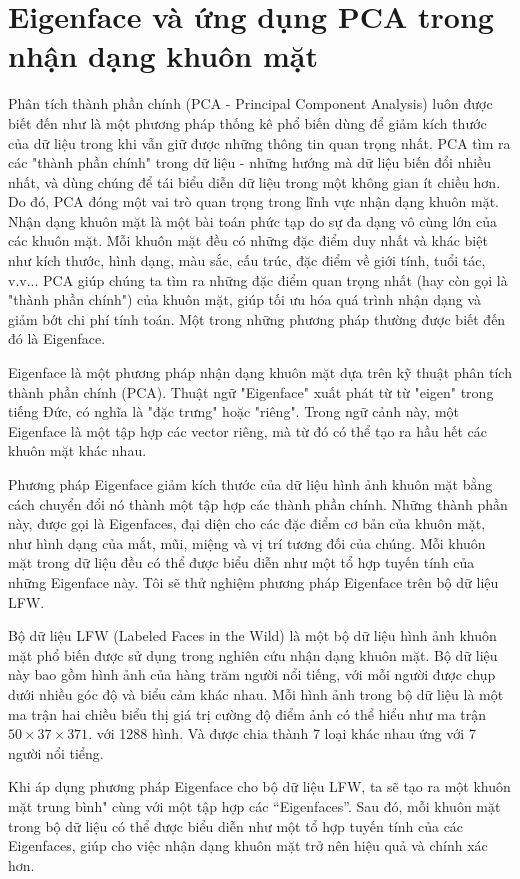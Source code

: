 \documentclass[14pt,oneside,a4paper]{report}
\numberwithin{equation}{section}
\begin{document}
\section{Eigenface và ứng dụng PCA trong nhận dạng khuôn mặt}
Phân tích thành phần chính (PCA - Principal Component Analysis) luôn được biết đến như là một phương pháp thống kê phổ biến dùng để giảm kích thước của dữ liệu trong khi vẫn giữ được những thông tin quan trọng nhất. PCA tìm ra các "thành phần chính" trong dữ liệu - những hướng mà dữ liệu biến đổi nhiều nhất, và dùng chúng để tái biểu diễn dữ liệu trong một không gian ít chiều hơn. Do đó, PCA đóng một vai trò quan trọng trong lĩnh vực nhận dạng khuôn mặt. Nhận dạng khuôn mặt là một bài toán phức tạp do sự đa dạng vô cùng lớn của các khuôn mặt. Mỗi khuôn mặt đều có những đặc điểm duy nhất và khác biệt như kích thước, hình dạng, màu sắc, cấu trúc, đặc điểm về giới tính, tuổi tác, v.v... PCA giúp chúng ta tìm ra những đặc điểm quan trọng nhất (hay còn gọi là "thành phần chính") của khuôn mặt, giúp tối ưu hóa quá trình nhận dạng và giảm bớt chi phí tính toán. Một trong những phương pháp thường được biết đến đó là Eigenface.

Eigenface là một phương pháp nhận dạng khuôn mặt dựa trên kỹ thuật phân tích thành phần chính (PCA). Thuật ngữ "Eigenface" xuất phát từ từ "eigen" trong tiếng Đức, có nghĩa là "đặc trưng" hoặc "riêng". Trong ngữ cảnh này, một Eigenface là một tập hợp các vector riêng, mà từ đó có thể tạo ra hầu hết các khuôn mặt khác nhau.

Phương pháp Eigenface giảm kích thước của dữ liệu hình ảnh khuôn mặt bằng cách chuyển đổi nó thành một tập hợp các thành phần chính. Những thành phần này, được gọi là Eigenfaces, đại diện cho các đặc điểm cơ bản của khuôn mặt, như hình dạng của mắt, mũi, miệng và vị trí tương đối của chúng. Mỗi khuôn mặt trong dữ liệu đều có thể được biểu diễn như một tổ hợp tuyến tính của những Eigenface này. Tôi sẽ thử nghiệm phương pháp Eigenface trên bộ dữ liệu LFW.

Bộ dữ liệu LFW (Labeled Faces in the Wild) là một bộ dữ liệu hình ảnh khuôn mặt phổ biến được sử dụng trong nghiên cứu nhận dạng khuôn mặt. Bộ dữ liệu này bao gồm hình ảnh của hàng trăm người nổi tiếng, với mỗi người được chụp dưới nhiều góc độ và biểu cảm khác nhau. Mỗi hình ảnh trong bộ dữ liệu là một ma trận hai chiều biểu thị giá trị cường độ điểm ảnh có thể hiểu như ma trận $50\times37\times371$. với 1288 hình. Và được chia thành 7 loại khác nhau ứng với 7 người nổi tiểng.

Khi áp dụng phương pháp Eigenface cho bộ dữ liệu LFW, ta sẽ tạo ra một khuôn mặt trung bình" cùng với một tập hợp các \textquotedblleft Eigenfaces\textquotedblright. Sau đó, mỗi khuôn mặt trong bộ dữ liệu có thể được biểu diễn như một tổ hợp tuyến tính của các Eigenfaces, giúp cho việc nhận dạng khuôn mặt trở nên hiệu quả và chính xác hơn.
\end{document}
